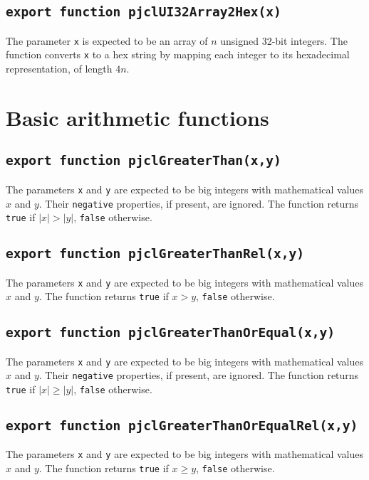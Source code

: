 \documentclass[12pt]{article}
\begin{document}
\subsection{\tt export function pjclUI32Array2Hex(x)}

The parameter {\tt x} is expected to be an array of $n$
unsigned 32-bit integers.  The function converts {\tt x} to a hex string by mapping
each integer to its hexadecimal representation, of length $4n$.

\section{Basic arithmetic functions}

\subsection{\tt export function pjclGreaterThan(x,y)}

The parameters {\tt x} and {\tt y} are expected to be big integers
with mathematical values $x$ and $y$.  Their {\tt negative}
properties, if present, are ignored.  The function returns {\tt true}
if $|x| > |y|$, {\tt false} otherwise.

\subsection{\tt export function pjclGreaterThanRel(x,y)}

The parameters {\tt x} and {\tt y} are expected to be big integers
with mathematical values $x$ and $y$.  The function returns {\tt true}
if $x > y$, {\tt false} otherwise.

\subsection{\tt export function pjclGreaterThanOrEqual(x,y)}

The parameters {\tt x} and {\tt y} are expected to be big integers
with mathematical values $x$ and $y$.  Their {\tt negative}
properties, if present, are ignored.  The function returns {\tt true}
if $|x| \geq |y|$, {\tt false} otherwise.

\subsection{\tt export function pjclGreaterThanOrEqualRel(x,y)}

The parameters {\tt x} and {\tt y} are expected to be big integers
with mathematical values $x$ and $y$.  The function returns {\tt true}
if $x \geq y$, {\tt false} otherwise.
\end{document}
